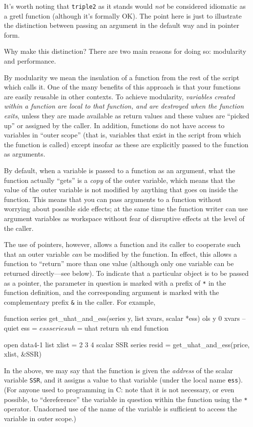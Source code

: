 It's worth noting that \texttt{triple2} as it stands would
\textit{not} be considered idiomatic as a gretl function (although
it's formally OK). The point here is just to illustrate the
distinction between passing an argument in the default way and in
pointer form.

Why make this distinction? There are two main reasons for doing so:
modularity and performance.

By modularity we mean the insulation of a function from the rest of
the script which calls it.  One of the many benefits of this approach
is that your functions are easily reusable in other contexts.  To
achieve modularity, \emph{variables created within a function are
  local to that function, and are destroyed when the function exits},
unless they are made available as return values and these values are
``picked up'' or assigned by the caller.  In addition, functions do
not have access to variables in ``outer scope'' (that is, variables
that exist in the script from which the function is called) except
insofar as these are explicitly passed to the function as arguments.

By default, when a variable is passed to a function as an argument,
what the function actually ``gets'' is a \emph{copy} of the outer
variable, which means that the value of the outer variable is not
modified by anything that goes on inside the function. This means that
you can pass arguments to a function without worrying about possible
side effects; at the same time the function writer can use argument
variables as workspace without fear of disruptive effects at the level
of the caller.

The use of pointers, however, allows a function and its caller to
cooperate such that an outer variable \textit{can} be modified by the
function.  In effect, this allows a function to ``return'' more than
one value (although only one variable can be returned directly---see
below).  To indicate that a particular object is to be passed as a
pointer, the parameter in question is marked with a prefix of
\texttt{*} in the function definition, and the corresponding argument
is marked with the complementary prefix \verb+&+ in the caller.  For
example,
%
\begin{code}
function series get_uhat_and_ess(series y, list xvars, scalar *ess)
  ols y 0 xvars --quiet
  ess = $ess
  series uh = $uhat
  return uh
end function

open data4-1
list xlist = 2 3 4
scalar SSR
series resid = get_uhat_and_ess(price, xlist, &SSR)
\end{code}
%
In the above, we may say that the function is given the \emph{address}
of the scalar variable \texttt{SSR}, and it assigns a value to that
variable (under the local name \texttt{ess}).  (For anyone used to
programming in \textsf{C}: note that it is not necessary, or even
possible, to ``dereference'' the variable in question within the
function using the \texttt{*} operator.  Unadorned use of the name of
the variable is sufficient to access the variable in outer scope.)

